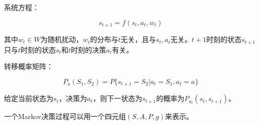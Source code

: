 系统方程：

\begin{equation}
    s_{t+1}=f(s_t,a_t,w_t)
\end{equation}

其中$w_t\in W$为随机扰动，$w_t$的分布与$t$无关，且与$s_t,a_t$无关。$t+1$时刻的状态$s_{t+1}$只与$t$时刻的状态$s_t$和$t$时刻的决策$a_t$有关。

转移概率矩阵：

\begin{equation}
    P_{a}(S_1,S_2)=P\{s_{t+1}=S_2|a_t=S_1,a_t=a\}
\end{equation}

给定当前状态为$s_t$，决策为$a_t$，则下一状态为$s_{t+1}$的概率为$P_{a_t}(s_t,s_{t+1})$。

一个Markov决策过程可以用一个四元组$(S,A,P,g)$来表示。

